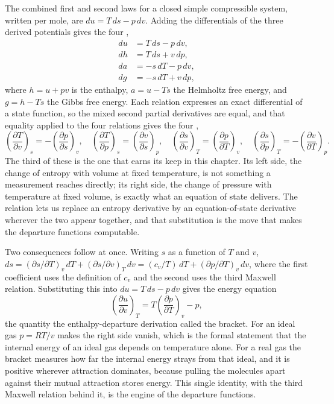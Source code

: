 The combined first and second laws for a closed simple compressible system,
written per mole, are $du = T\,ds - p\,dv$. Adding the differentials of the
three derived potentials gives the four ,
\begin{align*}
du &= T\,ds - p\,dv, \\
dh &= T\,ds + v\,dp, \\
da &= -s\,dT - p\,dv, \\
dg &= -s\,dT + v\,dp,
\end{align*}
where $h = u + pv$ is the enthalpy, $a = u - Ts$ the Helmholtz free
energy, and $g = h - Ts$ the Gibbs free energy. Each relation expresses an
exact differential of a state function, so the mixed second partial
derivatives are equal, and that equality applied to the four relations
gives the four ,
\[
\left(\frac{\partial T}{\partial v}\right)_s = -\left(\frac{\partial
p}{\partial s}\right)_v, \quad
\left(\frac{\partial T}{\partial p}\right)_s = \left(\frac{\partial
v}{\partial s}\right)_p, \quad
\left(\frac{\partial s}{\partial v}\right)_T = \left(\frac{\partial
p}{\partial T}\right)_v, \quad
\left(\frac{\partial s}{\partial p}\right)_T = -\left(\frac{\partial
v}{\partial T}\right)_p.
\]
The third of these is the one that earns its keep in this chapter. Its left
side, the change of entropy with volume at fixed temperature, is not
something a measurement reaches directly; its right side, the change of
pressure with temperature at fixed volume, is exactly what an equation of
state delivers. The relation lets us replace an entropy derivative by an
equation-of-state derivative wherever the two appear together, and that
substitution is the move that makes the departure functions computable.

Two consequences follow at once. Writing $s$ as a function of $T$ and $v$,
$ds = (\partial s/\partial T)_v\,dT + (\partial s/\partial v)_T\,dv =
(c_v/T)\,dT + (\partial p/\partial T)_v\,dv$, where the first coefficient
uses the definition of $c_v$ and the second uses the third Maxwell
relation. Substituting this into $du = T\,ds - p\,dv$ gives the energy
equation
\[
\left(\frac{\partial u}{\partial v}\right)_T = T\left(\frac{\partial
p}{\partial T}\right)_v - p,
\]
the quantity the enthalpy-departure derivation called the bracket. For an
ideal gas $p = RT/v$ makes the right side vanish, which is the formal
statement that the internal energy of an ideal gas depends on temperature
alone. For a real gas the bracket measures how far the internal energy
strays from that ideal, and it is positive wherever attraction dominates,
because pulling the molecules apart against their mutual attraction stores
energy. This single identity, with the third Maxwell relation behind it, is
the engine of the departure functions.


